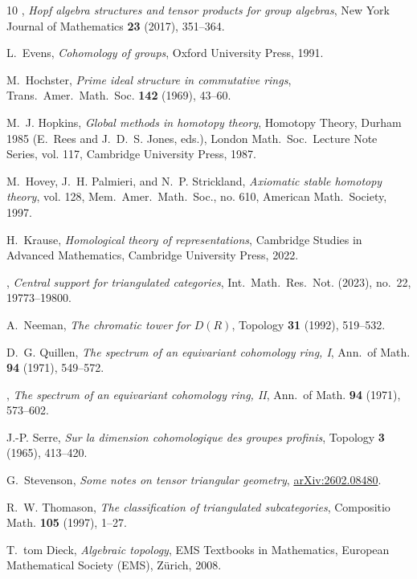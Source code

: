 \documentclass{amsart}[a4]
\theoremstyle{definition}
\theoremstyle{remark}
\numberwithin{equation}{section}
\begin{document}
\begin{thebibliography}{10}
\bysame, \emph{{Hopf algebra structures and tensor products for group
  algebras}}, New York Journal of Mathematics \textbf{23} (2017), 351--364.

L.~Evens, \emph{{Cohomology of groups}}, Oxford University Press, 1991.

M.~Hochster, \emph{{Prime ideal structure in commutative rings}}, Trans.\
  Amer.\ Math.\ Soc. \textbf{142} (1969), 43--60.

M.~J. Hopkins, \emph{{Global methods in homotopy theory}}, Homotopy Theory,
  Durham 1985 (E.~Rees and J.~D.~S. Jones, eds.), London Math.\ Soc.\ Lecture
  Note Series, vol. 117, Cambridge University Press, 1987.

M.~Hovey, J.~H. Palmieri, and N.~P. Strickland, \emph{{Axiomatic stable
  homotopy theory}}, vol. 128, Mem.\ Amer.\ Math.\ Soc., no. 610, American
  Math.\ Society, 1997.

H.~Krause, \emph{{Homological theory of representations}}, Cambridge Studies in
  Advanced Mathematics, Cambridge University Press, 2022.

\bysame, \emph{{Central support for triangulated categories}}, Int.\ Math.\
  Res.\ Not. (2023), no.~22, 19773--19800.

A.~Neeman, \emph{{The chromatic tower for $D(R)$}}, Topology \textbf{31}
  (1992), 519--532.

D.~G. Quillen, \emph{{The spectrum of an equivariant cohomology ring, I}},
  Ann.\ of Math. \textbf{94} (1971), 549--572.

\bysame, \emph{{The spectrum of an equivariant cohomology ring, II}}, Ann.\ of
  Math. \textbf{94} (1971), 573--602.

J.-P. Serre, \emph{{Sur la dimension cohomologique des groupes profinis}},
  Topology \textbf{3} (1965), 413--420.

G.~Stevenson, \emph{{Some notes on tensor triangular geometry}},
  \href{https://arxiv.org/abs/2602.08480}{arXiv:2602.08480}.

R.~W. Thomason, \emph{{The classification of triangulated subcategories}},
  Compositio Math. \textbf{105} (1997), 1--27.

T.~tom Dieck, \emph{{Algebraic topology}}, {EMS Textbooks in Mathematics},
  {European Mathematical Society (EMS), Z\"{u}rich}, 2008.

\end{thebibliography}
\end{document}
